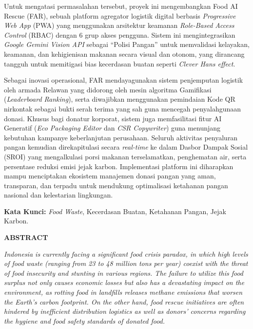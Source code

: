 Untuk mengatasi permasalahan tersebut, proyek ini mengembangkan Food AI Rescue (FAR), sebuah platform agregator logistik digital berbasis \textit{Progressive Web App} (PWA) yang menggunakan arsitektur keamanan \textit{Role-Based Access Control} (RBAC) dengan 6 grup akses pengguna. Sistem ini mengintegrasikan \textit{Google Gemini Vision API} sebagai ``Polisi Pangan'' untuk memvalidasi kelayakan, keamanan, dan kehigienisan makanan secara visual dan otonom, yang dirancang tangguh untuk memitigasi bias kecerdasan buatan seperti \textit{Clever Hans effect}.

Sebagai inovasi operasional, FAR mendayagunakan sistem penjemputan logistik oleh armada Relawan yang didorong oleh mesin algoritma Gamifikasi (\textit{Leaderboard Ranking}), serta diwajibkan menggunakan pemindaian Kode QR nirkontak sebagai bukti serah terima yang sah guna mencegah penyalahgunaan donasi. Khusus bagi donatur korporat, sistem juga memfasilitasi fitur AI Generatif (\textit{Eco Packaging Editor} dan \textit{CSR Copywriter}) guna menunjang kebutuhan kampanye keberlanjutan perusahaan. Seluruh aktivitas penyaluran pangan kemudian direkapitulasi secara \textit{real-time} ke dalam Dasbor Dampak Sosial (SROI) yang mengalkulasi porsi makanan terselamatkan, penghematan air, serta persentase reduksi emisi jejak karbon. Implementasi platform ini diharapkan mampu menciptakan ekosistem manajemen donasi pangan yang aman, transparan, dan terpadu untuk mendukung optimalisasi ketahanan pangan nasional dan kelestarian lingkungan.

\noindent \textbf{Kata Kunci:} \textit{Food Waste}, Kecerdasan Buatan, Ketahanan Pangan, Jejak Karbon.

\newpage
\begin{center}
    {\Large\bfseries ABSTRACT \par}
\end{center}
\textit{Indonesia is currently facing a significant food crisis paradox, in which high levels of food waste (ranging from 23 to 48 million tons per year) coexist with the threat of food insecurity and stunting in various regions. The failure to utilize this food surplus not only causes economic losses but also has a devastating impact on the environment, as rotting food in landfills releases methane emissions that worsen the Earth’s carbon footprint. On the other hand, food rescue initiatives are often hindered by inefficient distribution logistics as well as donors’ concerns regarding the hygiene and food safety standards of donated food.}

